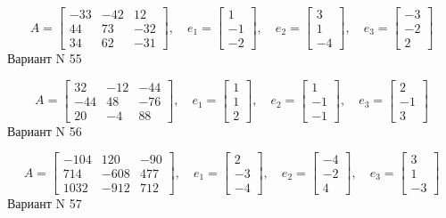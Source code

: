 \documentclass[11pt]{report}
\begin{document}
$$A = \left[\begin{matrix}-33 & -42 & 12\\44 & 73 & -32\\34 & 62 & -31\end{matrix}\right],\quad e_1 = \left[\begin{matrix}1\\-1\\-2\end{matrix}\right],\quad e_2 = \left[\begin{matrix}3\\1\\-4\end{matrix}\right],\quad e_3 = \left[\begin{matrix}-3\\-2\\2\end{matrix}\right]$$Вариант N 55

$$A = \left[\begin{matrix}32 & -12 & -44\\-44 & 48 & -76\\20 & -4 & 88\end{matrix}\right],\quad e_1 = \left[\begin{matrix}1\\1\\2\end{matrix}\right],\quad e_2 = \left[\begin{matrix}1\\-1\\-1\end{matrix}\right],\quad e_3 = \left[\begin{matrix}2\\-1\\3\end{matrix}\right]$$Вариант N 56

$$A = \left[\begin{matrix}-104 & 120 & -90\\714 & -608 & 477\\1032 & -912 & 712\end{matrix}\right],\quad e_1 = \left[\begin{matrix}2\\-3\\-4\end{matrix}\right],\quad e_2 = \left[\begin{matrix}-4\\-2\\4\end{matrix}\right],\quad e_3 = \left[\begin{matrix}3\\1\\-3\end{matrix}\right]$$Вариант N 57
\end{document}
